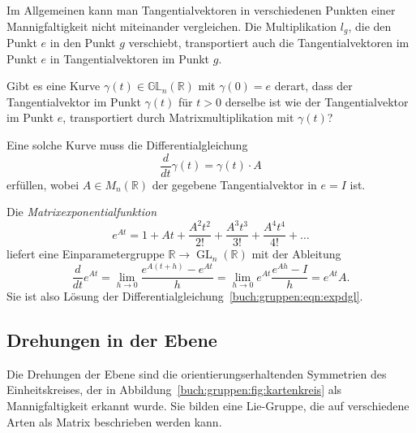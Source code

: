 Im Allgemeinen kann man Tangentialvektoren in verschiedenen Punkten
einer Mannigfaltigkeit nicht miteinander vergleichen.
Die Multiplikation $l_g$, die den Punkt $e$ in den Punkt $g$ verschiebt,
transportiert auch die Tangentialvektoren im Punkt $e$ in 
Tangentialvektoren im Punkt $g$.

\begin{aufgabe}
Gibt es eine Kurve $\gamma(t)\in\mathbb{GL}_n(\mathbb{R})$ mit
$\gamma(0)=e$ derart, dass der Tangentialvektor im Punkt $\gamma(t)$
für $t>0$ derselbe ist wie der Tangentialvektor im Punkt $e$, transportiert
durch Matrixmultiplikation mit $\gamma(t)$?
\end{aufgabe}

Eine solche Kurve muss die Differentialgleichung
\begin{equation}
\frac{d}{dt}\gamma(t)
=
\gamma(t)\cdot A
\label{buch:gruppen:eqn:expdgl}
\end{equation}
erfüllen, wobei $A\in M_n(\mathbb{R})$ der gegebene Tangentialvektor
in $e=I$ ist.

Die {\em Matrixexponentialfunktion}
%
\[
e^{At}
=
1+At+\frac{A^2t^2}{2!}+\frac{A^3t^3}{3!}+\frac{A^4t^4}{4!}+\dots
\]
liefert eine Einparametergruppe
$\mathbb{R}\to \operatorname{GL}_n(\mathbb{R})$ mit der Ableitung
\[
\frac{d}{dt} e^{At}
=
\lim_{h\to 0} \frac{e^{A(t+h)}-e^{At}}{h}
=
\lim_{h\to 0} e^{At}\frac{e^{Ah}-I}{h}
=
e^{At} A.
\]
Sie ist also Lösung der Differentialgleichung~\eqref{buch:gruppen:eqn:expdgl}.

\subsection{Drehungen in der Ebene
\label{buch:gruppen:drehungen2d}}
Die Drehungen der Ebene sind die orientierungserhaltenden Symmetrien
des Einheitskreises, der in Abbildung~\ref{buch:gruppen:fig:kartenkreis}
als Mannigfaltigkeit erkannt wurde.
Sie bilden eine Lie-Gruppe, die auf verschiedene Arten als Matrix
beschrieben werden kann.

